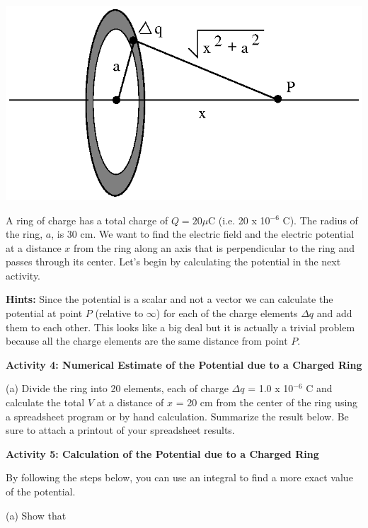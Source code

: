 \vspace{0.3cm}
{\centering \includegraphics{electric_potential_fig_5.eps} \par}
\vspace{0.3cm}

\vspace{2in}
A ring of charge has a total charge of $Q = 20$\( \mu  \)C (i.e. 20
x 10\( ^{-6} \) C). The radius of the ring, $a$, is 30 cm. We want
to find the electric field and the electric potential at a distance $x$ from the ring along an axis that is perpendicular to the ring
and passes through its center. Let's begin by calculating the potential
in the next activity.

\textbf{Hints:} Since the potential is a scalar and not a vector we
can calculate the potential at point $P$ (relative to \( \infty  \))
for each of the charge elements \( \Delta q \) and add them to each
other. This looks like a big deal but it is actually a trivial problem
because all the charge elements are the same distance from point $P$.

\textbf{Activity 4: Numerical Estimate of the Potential due to a Charged
Ring}

(a) Divide the ring into 20 elements, each of charge \( \Delta q \) = 1.0 x 10\( ^{-6} \) C and
calculate the total $V$ at a distance of $x$ = 20 cm from the center of
the ring using a spreadsheet program or by hand calculation. Summarize
the result below. Be sure to attach a printout of your spreadsheet
results.
\vspace{1.5in}

\textbf{Activity 5: Calculation of the Potential due to a Charged Ring}

By following the steps below, you can use an integral to find a more
exact value of the potential.

(a) Show that

